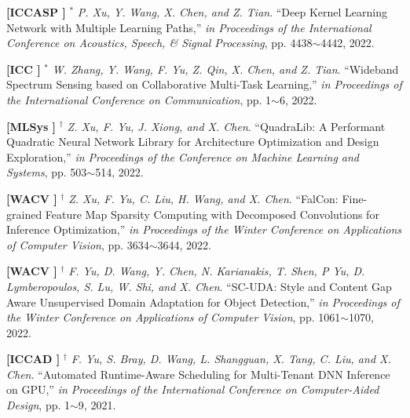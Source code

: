 	\textbf{[ICCASP ]}
	$^\ast$
	\textsl{P. Xu, Y. Wang, X. Chen, and Z. Tian}.
		``Deep Kernel Learning Network with Multiple Learning Paths,''
		\textsl{in Proceedings of the International Conference on Acoustics, Speech, \& Signal Processing}, pp. 4438$\sim$4442, 2022.
			\vspace{-3mm}

	\textbf{[ICC ]}
	$^\ast$
	\textsl{W. Zhang, Y. Wang, F. Yu, Z. Qin, X. Chen, and Z. Tian}.
		``Wideband Spectrum Sensing based on Collaborative Multi-Task Learning,''
		\textsl{in Proceedings of the International Conference on Communication}, pp. 1$\sim$6, 2022.
			\vspace{-3mm}

	\textbf{[MLSys ]}
	$^\dagger$
	\textsl{Z. Xu, F. Yu, J. Xiong, and X. Chen}.
		``QuadraLib: A Performant Quadratic Neural Network Library for Architecture Optimization and Design Exploration,''
		\textsl{in Proceedings of the Conference on Machine Learning and Systems}, pp. 503$\sim$514, 2022.
			\vspace{-3mm}

	\textbf{[WACV ]}
	$^\dagger$
	\textsl{Z. Xu, F. Yu, C. Liu, H. Wang, and X. Chen}.
		``FalCon: Fine-grained Feature Map Sparsity Computing with Decomposed Convolutions for Inference Optimization,''
		\textsl{in Proceedings of the Winter Conference on Applications of Computer Vision}, pp. 3634$\sim$3644, 2022.
			\vspace{-3mm}

	\textbf{[WACV ]}
	$^\dagger$
	\textsl{F. Yu, D. Wang, Y. Chen, N. Karianakis, T. Shen, P Yu, D. Lymberopoulos, S. Lu, W. Shi, and X. Chen}.
		``SC-UDA: Style and Content Gap Aware Unsupervised Domain Adaptation for Object Detection,''
		\textsl{in Proceedings of the Winter Conference on Applications of Computer Vision}, pp. 1061$\sim$1070, 2022.
			\vspace{-3mm}

	\textbf{[ICCAD ]}
	$^\dagger$
	\textsl{F. Yu, S. Bray, D. Wang, L. Shangguan, X. Tang, C. Liu, and X. Chen}.
		``Automated Runtime-Aware Scheduling for Multi-Tenant DNN Inference on GPU,''
		\textsl{in Proceedings of the International Conference on Computer-Aided Design}, pp. 1$\sim$9, 2021.
			\vspace{-3mm}

